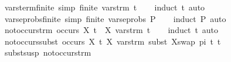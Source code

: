 \begin{isabellebody}
\isanewline
\isanewline
{}\isamarkupfalse%
\ vars{\isacharunderscore}{\kern0pt}term{\isacharunderscore}{\kern0pt}finite\ {\isacharbrackleft}{\kern0pt}simp{\isacharbrackright}{\kern0pt}{\isacharcolon}{\kern0pt}\ {\isachardoublequoteopen}finite\ {\isacharparenleft}{\kern0pt}vars{\isacharunderscore}{\kern0pt}trm\ t{\isacharparenright}{\kern0pt}{\isachardoublequoteclose}\isanewline
%
\isadelimproof
\ \ %
\endisadelimproof
%
\isatagproof
{}\isamarkupfalse%
\ {\isacharparenleft}{\kern0pt}induct\ t{\isacharparenright}{\kern0pt}\ auto%
\endisatagproof
{\isafoldproof}%
%
\isadelimproof
\isanewline
%
\endisadelimproof
\isanewline
\isanewline
{}\isamarkupfalse%
\ vars{\isacharunderscore}{\kern0pt}eprobs{\isacharunderscore}{\kern0pt}finite\ {\isacharbrackleft}{\kern0pt}simp{\isacharbrackright}{\kern0pt}{\isacharcolon}{\kern0pt}\ {\isachardoublequoteopen}finite\ {\isacharparenleft}{\kern0pt}vars{\isacharunderscore}{\kern0pt}eprobs\ P{\isacharparenright}{\kern0pt}{\isachardoublequoteclose}\isanewline
%
\isadelimproof
\ \ %
\endisadelimproof
%
\isatagproof
{}\isamarkupfalse%
\ {\isacharparenleft}{\kern0pt}induct\ P{\isacharparenright}{\kern0pt}\ auto%
\endisatagproof
{\isafoldproof}%
%
\isadelimproof
\isanewline
%
\endisadelimproof
\isanewline
\isanewline
{}\isamarkupfalse%
\ not{\isacharunderscore}{\kern0pt}occurs{\isacharunderscore}{\kern0pt}trm{\isacharcolon}{\kern0pt}\ {\isachardoublequoteopen}{\isasymnot}occurs\ X\ t\ {\isasymlongrightarrow}\ X{\isasymnotin}\ vars{\isacharunderscore}{\kern0pt}trm\ t{\isachardoublequoteclose}\isanewline
%
\isadelimproof
\ \ %
\endisadelimproof
%
\isatagproof
{}\isamarkupfalse%
\ {\isacharparenleft}{\kern0pt}induct\ t{\isacharparenright}{\kern0pt}\ auto%
\endisatagproof
{\isafoldproof}%
%
\isadelimproof
\isanewline
%
\endisadelimproof
\isanewline
{}\isamarkupfalse%
\ not{\isacharunderscore}{\kern0pt}occurs{\isacharunderscore}{\kern0pt}subst{\isacharcolon}{\kern0pt}\ {\isachardoublequoteopen}{\isasymnot}occurs\ X\ t{}{\isasymlongrightarrow}\ X{\isasymnotin}\ vars{\isacharunderscore}{\kern0pt}trm\ {\isacharparenleft}{\kern0pt}subst\ {\isacharbrackleft}{\kern0pt}{\isacharparenleft}{\kern0pt}X{\isacharcomma}{\kern0pt}swap\ pi{}\ t{}{\isacharparenright}{\kern0pt}{\isacharbrackright}{\kern0pt}\ t{}{\isacharparenright}{\kern0pt}{\isachardoublequoteclose}\ \isanewline
%
\isadelimproof
\ \ %
\endisadelimproof
%
\isatagproof
{}\isamarkupfalse%
\ subst{\isacharunderscore}{\kern0pt}susp\ not{\isacharunderscore}{\kern0pt}occurs{\isacharunderscore}{\kern0pt}trm\ \isamarkupfalse%

\end{isabellebody}
